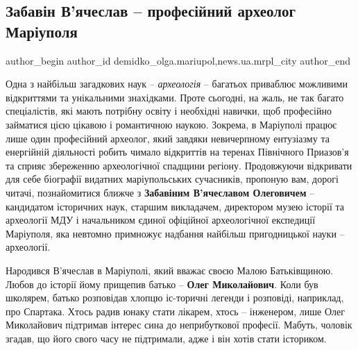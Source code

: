  
 
 
 
 
 
\subsection{Забавін В'ячеслав – професійний археолог Маріуполя}
\label{sec:11_05_2019.stz.news.ua.mrpl_city.2.zabavin_vjacheslav_prof_arheolog_mrpl}
 
\ifcmt
 author_begin
   author_id demidko_olga.mariupol,news.ua.mrpl_city
 author_end
\fi


Одна з найбільш загадкових наук – \emph{археологія} – багатьох приваблює можливими
відкриттями та унікальними знахідками. Проте сьогодні, на жаль, не так багато
спеціалістів, які мають потрібну освіту і необхідні навички, щоб професійно
займатися цією цікавою і романтичною наукою. Зокрема, в Маріуполі працює лише
один професійний археолог, який завдяки невичерпному ентузіазму та енергійній
діяльності робить чимало відкриттів на теренах Північного Приазов'я та сприяє
збереженню археологічної спадщини регіону. Продовжуючи відкривати для себе
біографії видатних маріупольських сучасників, пропоную вам, дорогі читачі,
познайомитися ближче з \textbf{Забавіним В'ячеславом Олеговичем} – кандидатом історичних
наук, старшим викладачем, директором музею історії та археології МДУ і
начальником єдиної офіційної археологічної експедиції Маріуполя, яка невтомно
примножує надбання найбільш пригодницької науки – археології.


Народився В'ячеслав в Маріуполі, який вважає своєю Малою Батьківщиною. Любов до
історії йому прищепив батько – \textbf{Олег Миколайович}. Коли був школярем, батько
розповідав хлопцю іс\hyp{}торичні легенди і розповіді, наприклад, про Спартака. Хтось
радив юнаку стати лікарем, хтось – інженером, лише Олег Миколайович підтримав
інтерес сина до неприбуткової професії. Мабуть, чоловік згадав, що його свого
часу не підтримали, адже і він хотів стати істориком.

